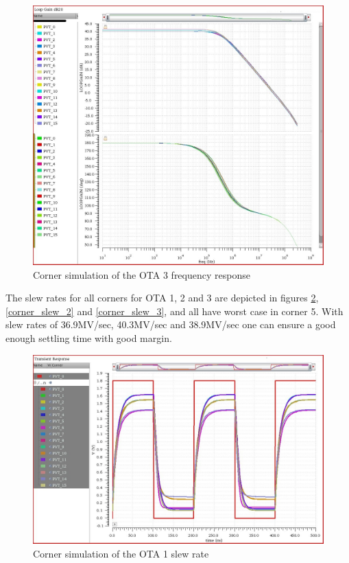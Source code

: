 \begin{figure}[H]
\centering
\includegraphics[width=\textwidth]{images/corner_gbw_phase_3.jpg}
\caption{Corner simulation of the OTA 3 frequency response}
\label{corner_freq_3}
\end{figure}

The slew rates for all corners for OTA 1, 2 and 3 are depicted in figures \ref{corner_slew_1}, \ref{corner_slew_2} and \ref{corner_slew_3}, and all have worst case in corner 5. With slew rates of 36.9MV/sec, 40.3MV/sec and 38.9MV/sec one can ensure a good enough settling time with good margin. 

\begin{figure}[H]
\centering
\includegraphics[width=\textwidth]{images/corner_slew_rate_1.jpg}
\caption{Corner simulation of the OTA 1 slew rate}
\label{corner_slew_1}
\end{figure}

